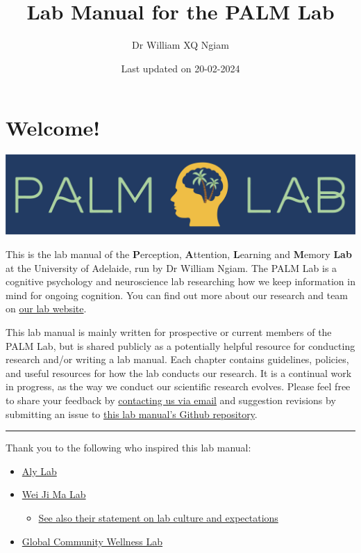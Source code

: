 \documentclass[
]{book}
\title{Lab Manual for the PALM Lab}
\author{Dr William XQ Ngiam}
\date{Last updated on 20-02-2024}
\providecommand{\tightlist}{%
  \setlength{\itemsep}{0pt}\setlength{\parskip}{0pt}}
\begin{document}
\maketitle

{
\setcounter{tocdepth}{1}
\tableofcontents
}
\hypertarget{welcome}{%
\chapter*{Welcome!}\label{welcome}}

\includegraphics{images/banner.png}

This is the lab manual of the \textbf{P}erception, \textbf{A}ttention, \textbf{L}earning and \textbf{M}emory \textbf{Lab} at the University of Adelaide, run by Dr William Ngiam. The PALM Lab is a cognitive psychology and neuroscience lab researching how we keep information in mind for ongoing cognition. You can find out more about our research and team on \href{https://palm-lab.github.io}{our lab website}.

This lab manual is mainly written for prospective or current members of the PALM Lab, but is shared publicly as a potentially helpful resource for conducting research and/or writing a lab manual. Each chapter contains guidelines, policies, and useful resources for how the lab conducts our research. It is a continual work in progress, as the way we conduct our scientific research evolves. Please feel free to share your feedback by \href{mailto:palm.laboratory@gmail.com}{contacting us via email} and suggestion revisions by submitting an issue to \href{https://github.com/PALM-lab/lab-manual/issues}{this lab manual's Github repository}.

\begin{center}\rule{0.5\linewidth}{0.5pt}\end{center}

Thank you to the following who inspired this lab manual:

\begin{itemize}
\tightlist
\item
  \href{https://github.com/alylab/labmanual/blob/master/aly-lab-manual.pdf}{Aly Lab}
\item
  \href{https://www.cns.nyu.edu/malab/lablife.html}{Wei Ji Ma Lab}

  \begin{itemize}
  \tightlist
  \item
    \href{https://docs.google.com/document/d/1f6foaCkHiCkPKjO0gdKkkdm2dn1EKn5xRKZv-Ut5Dg4/edit?usp=sharing}{See also their statement on lab culture and expectations}
  \end{itemize}
\item
  \href{https://bookdown.org/jordandanielsnyder/LabManual/expectations-and-responsiblities.html}{Global Community Wellness Lab}
\end{itemize}
\end{document}
